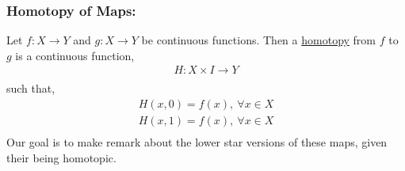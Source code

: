 \documentclass[../notes.tex]{subfiles}
\begin{document}
    \subsubsection{Homotopy of Maps:}
        \begin{definition} Let $f: X\rightarrow Y$ and $g: X\rightarrow Y$ be continuous functions.
        Then a \underline{homotopy} from $f$ to $g$ is a continuous function,
        \begin{align*}
            H: X\times I\rightarrow Y\\
        \end{align*}
        such that,
        \begin{align*}
            H(x,0)=f(x),\ \forall x\in X\\
            H(x,1)=f(x),\ \forall x\in X\\
        \end{align*}
        Our goal is to make remark about the lower star versions of these maps, given their being homotopic.
        \end{definition}
\end{document}
